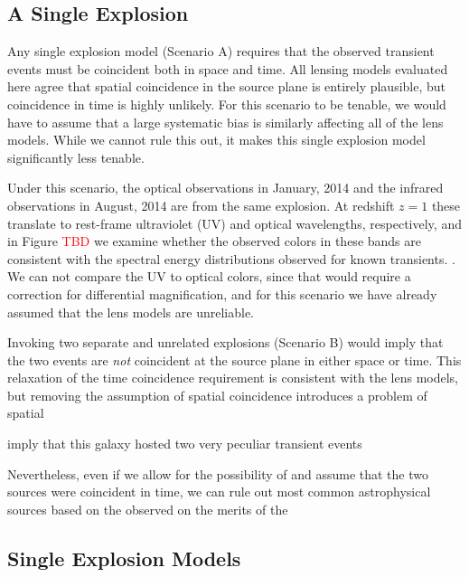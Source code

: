 


\subsection{A Single Explosion}

Any single explosion model (Scenario A) requires that the observed
transient events must be coincident both in space and time.  All
lensing models evaluated here agree that spatial coincidence in the
source plane is entirely plausible, but coincidence in time is highly
unlikely. For this scenario to be tenable, we would have to assume
that a large systematic bias is similarly affecting all of the lens
models.  While we cannot rule this out, it makes this single explosion
model significantly less tenable. 

Under this scenario, the optical observations in January, 2014 and the
infrared observations in August, 2014 are from the same explosion. At
redshift $z=1$ these translate to rest-frame ultraviolet (UV) and
optical wavelengths, respectively, and in Figure \textcolor{red}{TBD}
we examine whether the observed colors in these bands are consistent
with the spectral energy distributions observed for known transients.
.  We can not
compare the UV to optical colors, since that would require a
correction for differential magnification, and for this scenario we
have already assumed that the lens models are unreliable. 



Invoking two separate and unrelated explosions (Scenario B) would imply that the two events are {\it not} coincident at the source plane in either space or time.  This relaxation of the time coincidence requirement is consistent with the lens models, but removing the assumption of spatial coincidence introduces a problem of spatial 

imply that this galaxy hosted two very peculiar transient events 

Nevertheless, even if we allow for the possibility of and assume that the
two sources were coincident in time, we can rule out most common astrophysical sources based on the observed  on
the merits of the


\subsection{Single Explosion Models}


